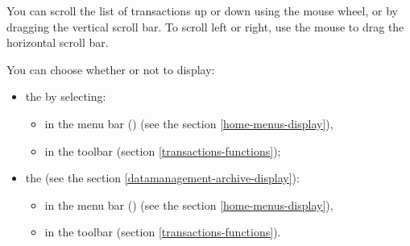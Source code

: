 You can scroll the list of transactions up or down using the mouse wheel, or by dragging the vertical scroll bar. To scroll left or right, use the mouse to drag the horizontal scroll bar.

You can choose whether or not to display:
\begin{itemize}
	\item the  by selecting:
		\begin{itemize}
			\item in the menu bar  () (see the section \vref{home-menus-display}),
			\item in the toolbar  (section \vref{transactions-functions});
		\end{itemize} 
	\item the  (see the section  \vref{datamanagement-archive-display}):
		\begin{itemize}
			\item in the menu bar  () (see the section \vref{home-menus-display}),
			\item in the toolbar  (section \vref{transactions-functions}).
		\end{itemize}
\end{itemize}


